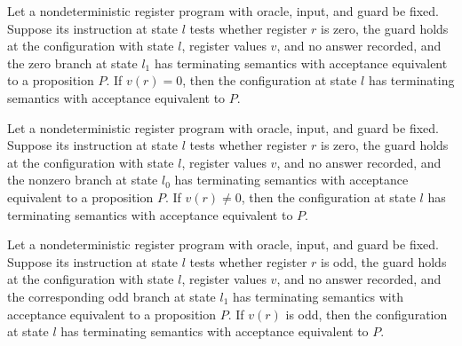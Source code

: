 \begin{lemma}
\label{Complexity.LogProg.NSem.jz_pos}
\leanok
{}
Let a nondeterministic register program with oracle, input, and guard be fixed. Suppose
its instruction at state $l$ tests whether register $r$ is zero, the guard holds at the
configuration with state $l$, register values $v$, and no answer recorded, and the zero
branch at state $l_1$ has terminating semantics with acceptance equivalent to a
proposition $P$. If $v(r)=0$, then the configuration at state $l$ has terminating
semantics with acceptance equivalent to $P$.
\end{lemma}

\begin{lemma}
\label{Complexity.LogProg.NSem.jz_neg}
\leanok
{}
Let a nondeterministic register program with oracle, input, and guard be fixed. Suppose
its instruction at state $l$ tests whether register $r$ is zero, the guard holds at the
configuration with state $l$, register values $v$, and no answer recorded, and the
nonzero branch at state $l_0$ has terminating semantics with acceptance equivalent to a
proposition $P$. If $v(r)\ne 0$, then the configuration at state $l$ has terminating
semantics with acceptance equivalent to $P$.
\end{lemma}

\begin{lemma}
\label{Complexity.LogProg.NSem.jodd_pos}
\leanok
{}
Let a nondeterministic register program with oracle, input, and guard be fixed. Suppose
its instruction at state $l$ tests whether register $r$ is odd, the guard holds at the
configuration with state $l$, register values $v$, and no answer recorded, and the
corresponding odd branch at state $l_1$ has terminating semantics with acceptance
equivalent to a proposition $P$. If $v(r)$ is odd, then the configuration at state $l$
has terminating semantics with acceptance equivalent to $P$.
\end{lemma}

